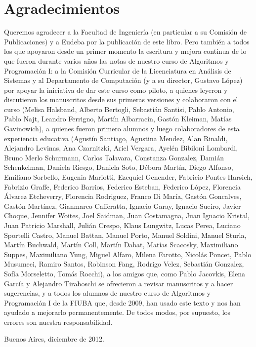 \section*{Agradecimientos}

Queremos agradecer a la Facultad de Ingeniería (en particular a su Comisión de Publicaciones) y a
Eudeba por la publicación de este libro. Pero también a todos los que apoyaron desde un primer momento
la escritura y mejora continua de lo que fueron durante varios años las notas de nuestro curso de
Algoritmos y Programación I: a la Comisión Curricular de la Licenciatura en Análisis de Sistemas y al
Departamento de Computación (y a su director, Gustavo López) por apoyar la iniciativa de dar este curso
como piloto, a quienes leyeron y discutieron los manuscritos desde sus primeras versiones y colaboraron
con el curso (Melisa Halsband, Alberto Bertogli, Sebastián Santisi, Pablo Antonio, Pablo Najt,
Leandro Ferrigno, Martín Albarracín, Gastón Kleiman, Matías Gavinowich), a quienes fueron primero alumnos y
luego colaboradores de esta experiencia educativa
(Agustín Santiago,
Agustina Mendez,
Alan Rinaldi,
Alejandro Levinas,
Ana Czarnitzki,
Ariel Vergara,
Ayelén Bibiloni Lombardi,
Bruno Merlo Schurmann,
Carlos Talavara,
Constanza Gonzalez,
Damián Schenkelman,
Daniela Riesgo,
Daniela Soto,
Débora Martín,
Diego Alfonso,
Emiliano Sorbello,
Eugenia Mariotti,
Ezequiel Genender,
Fabricio Pontes Harsich,
Fabrizio Graffe,
Federico Barrios,
Federico Esteban,
Federico López,
Florencia Álvarez Etcheverry,
Florencia Rodriguez,
Franco Di María,
Gastón Goncalves,
Gastón Martínez,
Gianmarco Cafferatta,
Ignacio Garay,
Ignacio Sueiro,
Javier Choque,
Jennifer Woites,
Joel Saidman,
Juan Costamagna,
Juan Ignacio Kristal,
Juan Patricio Marshall,
Julián Crespo,
Klaus Lungwitz,
Lucas Perea,
Luciano Sportelli Castro,
Manuel Battan,
Manuel Porto,
Manuel Soldini,
Manuel Sturla,
Martín Buchwald,
Martín Coll,
Martín Dabat,
Matías Scacosky,
Maximiliano Suppes,
Maximiliano Yung,
Miguel Alfaro,
Milena Farotto,
Nicolás Poncet,
Pablo Musumeci,
Ramiro Santos,
Robinson Fang,
Rodrigo Velez,
Sebastián Gonzalez,
Sofía Morseletto,
Tomás Rocchi),
a los amigos que, como Pablo Jacovkis, Elena García y Alejandro Tiraboschi se ofrecieron a
revisar manuscritos y a hacer sugerencias, y a todos los alumnos de nuestro curso de Algoritmos y
Programación I de la FIUBA que, desde 2009, han usado este texto y nos han ayudado a mejorarlo permanentemente.
De todos modos, por supuesto, los errores son nuestra responsabilidad.


\hfill Buenos Aires, diciembre de 2012.

